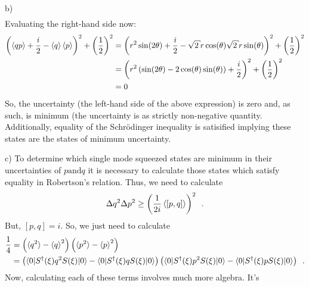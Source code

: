 \begin{homeworkProblem}[Problem 10]
\begin{homeworkSection}{b)}
\begin{align}
   \end{align}
   Evaluating the right-hand side now:
   \begin{align}
      \left(
      \braket{qp} + \frac{i}{2} - \braket{q} \braket{p} \right)^2 +
      \left( \frac{1}{2} \right)^2  &=
      \left( r^{2} \sin(2\theta) + \frac{i}{2} - \sqrt{2}r \cos(\theta) \sqrt{2} r
      \sin(\theta) \right)^2 + \left( \frac{1}{2} \right)^{2} \\
      &= \left( r^{2}\left(\sin(2\theta) - 2 \cos(\theta)\sin(\theta)\right) +
   \frac{i}{2} \right)^2 + \left(\frac{1}{2}\right)^2 \\
   &= 0
   \end{align}
   So, the uncertainty (the left-hand side of the above expression) is zero and,
   as such, is minimum (the uncertainty is as strictly non-negative quantity.
   Additionally, equality of the Schr\"{o}dinger inequality is satisified implying these states are the
   states of minimum uncertainty.
   \begin{homeworkSection}{c)}
      To determine which single mode squeezed states are minimum in their
      uncertainties of $ p \text{and} q $ it is necessary to calculate those
      states which satisfy equality in Robertson's relation. Thus, we need to
      calculate
      \begin{align}
         \Delta q^2 \Delta p^2 \ge \left( \frac{1}{2i} \braket{[p,q]}
         \right)^2 \enskip.
      \end{align}
      But, $ [p,q] = i $. So, we just need to calculate
      \begin{align}
         \frac{1}{4} &=
         \left( \braket{q^2} - \braket{q}^2 \right)
         \left( \braket{p^2} - \braket{p}^2 \right) \\
         &= \left( \braket{0|S^{\dagger}(\xi)q^{2}S(\xi)|0} -
      \braket{0|S^{\dagger}(\xi)qS(\xi)|0} \right)
      \left( \braket{0|S^{\dagger}(\xi)p^{2}S(\xi)|0} -
         \braket{0|S^{\dagger}(\xi)pS(\xi)|0}
         \right) \enskip.
      \end{align}
      Now, calculating each of these terms involves much more algebra. It's

\end{homeworkSection}
\end{homeworkSection}
\end{homeworkProblem}
